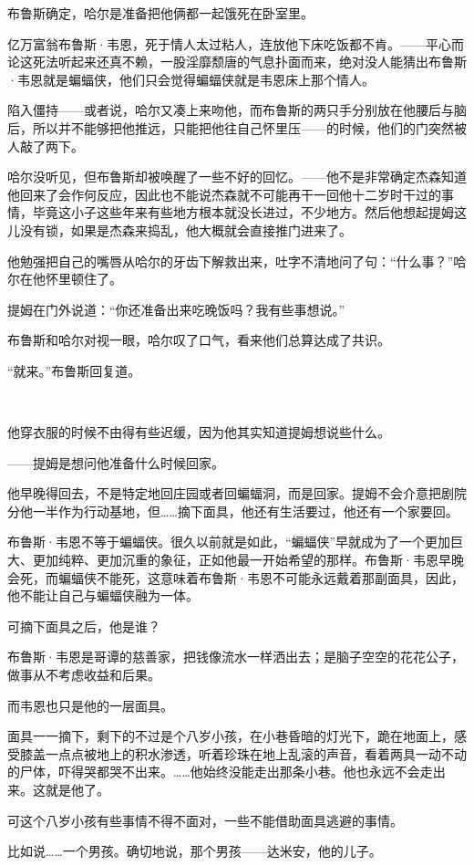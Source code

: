 \documentclass[../main]{subfiles}
\begin{document}
布鲁斯确定，哈尔是准备把他俩都一起饿死在卧室里。

亿万富翁布鲁斯·韦恩，死于情人太过粘人，连放他下床吃饭都不肯。——平心而论这死法听起来还真不赖，一股淫靡颓唐的气息扑面而来，绝对没人能猜出布鲁斯·韦恩就是蝙蝠侠，他们只会觉得蝙蝠侠就是韦恩床上那个情人。

陷入僵持——或者说，哈尔又凑上来吻他，而布鲁斯的两只手分别放在他腰后与脑后，所以并不能够把他推远，只能把他往自己怀里压——的时候，他们的门突然被人敲了两下。

哈尔没听见，但布鲁斯却被唤醒了一些不好的回忆。——他不是非常确定杰森知道他回来了会作何反应，因此也不能说杰森就不可能再干一回他十二岁时干过的事情，毕竟这小子这些年来有些地方根本就没长进过，不少地方。然后他想起提姆这儿没有锁，如果是杰森来捣乱，他大概就会直接推门进来了。

他勉强把自己的嘴唇从哈尔的牙齿下解救出来，吐字不清地问了句：“什么事？”哈尔在他怀里顿住了。

提姆在门外说道：“你还准备出来吃晚饭吗？我有些事想说。”

布鲁斯和哈尔对视一眼，哈尔叹了口气，看来他们总算达成了共识。

“就来。”布鲁斯回复道。

~\

他穿衣服的时候不由得有些迟缓，因为他其实知道提姆想说些什么。

——提姆是想问他准备什么时候回家。

他早晚得回去，不是特定地回庄园或者回蝙蝠洞，而是回家。提姆不会介意把剧院分他一半作为行动基地，但……摘下面具，他还有生活要过，他还有一个家要回。

布鲁斯·韦恩不等于蝙蝠侠。很久以前就是如此，“蝙蝠侠”早就成为了一个更加巨大、更加纯粹、更加沉重的象征，正如他最一开始希望的那样。布鲁斯·韦恩早晚会死，而蝙蝠侠不能死，这意味着布鲁斯·韦恩不可能永远戴着那副面具，因此，他不能让自己与蝙蝠侠融为一体。

可摘下面具之后，他是谁？

布鲁斯·韦恩是哥谭的慈善家，把钱像流水一样洒出去；是脑子空空的花花公子，做事从不考虑收益和后果。

而韦恩也只是他的一层面具。

面具一一摘下，剩下的不过是个八岁小孩，在小巷昏暗的灯光下，跪在地面上，感受膝盖一点点被地上的积水渗透，听着珍珠在地上乱滚的声音，看着两具一动不动的尸体，吓得哭都哭不出来。……他始终没能走出那条小巷。他也永远不会走出来。这就是他了。

可这个八岁小孩有些事情不得不面对，一些不能借助面具逃避的事情。

比如说……一个男孩。确切地说，那个男孩——达米安，他的儿子。
\end{document}
